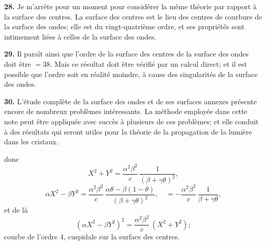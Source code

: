 \documentclass[11pt,a4paper]{book}
\begin{document}
{{{\textbf{28.} Je m'arr\^ete pour un moment pour consid\'erer la m\^eme th\'eorie par
rapport \`a la surface des centres. La surface des centres est le lieu des centres de
courbure de la surface des ondes; elle est du vingt-quatri\`eme ordre, et ses
propri\'et\'es sont intimement li\'ees \`a celles de la surface des ondes.

\textbf{29.} Il para\^it ainsi que l'ordre de la surface des centres de la surface des
ondes doit \^etre $= 38$. Mais ce r\'esultat doit \^etre v\'erifi\'e par un calcul direct; et il
est possible que l'ordre soit en r\'ealit\'e moindre, \`a cause des singularit\'es de la
surface des ondes.

\textbf{30.} L'\'etude compl\`ete de la surface des ondes et de ses surfaces annexes
pr\'esente encore de nombreux probl\`emes int\'eressants. La m\'ethode employ\'ee dans
cette note peut \^etre appliqu\'ee avec succ\`es \`a plusieurs de ces probl\`emes; et elle
conduit \`a des r\'esultats qui seront utiles pour la th\'eorie de la propagation de la
lumi\`ere dans les cristaux.
\clearpage


\setcounter{page}{251}


\begin{flushright}
\end{flushright}

donc
\[
X^2 + Y^2 = \frac{\alpha^2\beta^2}{c}\,\frac{1}{(\beta+\gamma\theta)^2},
\]
\[
\alpha X^2 - \beta Y^2 = \frac{\alpha^2\beta^2}{c}\,\frac{\alpha\theta - \beta(1-\theta)}{(\beta+\gamma\theta)^2},
\quad = -\frac{\alpha^2\beta^2}{c}\,\frac{1}{\beta+\gamma\theta},
\]
et de l\`a
\[
(\alpha X^2 - \beta Y^2)^2 = \frac{\alpha^2\beta^2}{c}\,(X^2 + Y^2);
\]
courbe de l'ordre 4, cuspidale sur la surface des centres.

}}}
\end{document}

